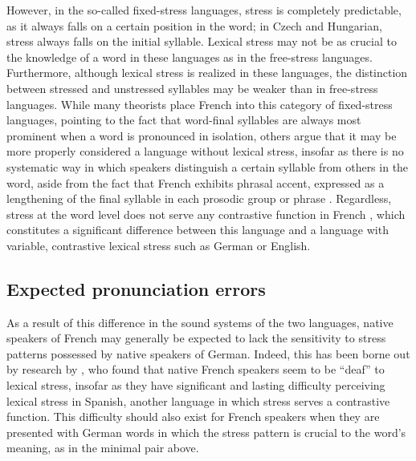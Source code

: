 			However, in the so-called fixed-stress languages, stress is completely predictable, as it always falls on a certain position in the word;
in Czech and Hungarian, stress always falls on the initial syllable. Lexical stress may not be as crucial to the knowledge of a word in these languages as in the free-stress languages. Furthermore, although lexical stress is realized in these languages, the distinction between stressed and unstressed syllables may be weaker than in free-stress languages.
%
 While many theorists place French 
 into this category of fixed-stress languages, pointing to the fact that word-final syllables are always most prominent when a word is pronounced in isolation,
 others argue that
 it may be more properly considered a language without lexical stress, insofar as there is no systematic way in which speakers distinguish a certain syllable from others in the word, aside from the fact that French exhibits phrasal accent, expressed as a lengthening of the final syllable in each prosodic group or phrase \citep{Dupoux2008,Michaux2013}.  
 Regardless, stress at the word level does not serve any contrastive function in French \citep[p.~89]{Michaux2013}, 
 which
 constitutes a significant difference between this language and a language with variable, contrastive lexical stress such as German or English. 
 
			
		\subsection{Expected pronunciation errors}
		\label{sec:stress:expected}
		As a result of this difference in the sound systems of the two languages,
		native speakers of French may generally be expected to lack the sensitivity to stress patterns possessed by native speakers of German. Indeed, this has been borne out by research by \textcite{Dupoux2008},
  who found that native French speakers seem to be ``deaf'' to 
  lexical stress, 
  insofar as they have significant and lasting difficulty
  perceiving 
  lexical stress in Spanish, another language in which stress serves a contrastive function.
  This difficulty should also exist for French speakers when they are presented with German words in which the stress pattern is crucial to the word's meaning, as in the minimal pair above. 
  
